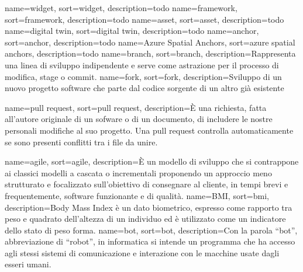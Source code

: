 
\renewcommand{\acronymname}{Acronimi e abbreviazioni}




\renewcommand{\glsnamefont}[1]{\makefirstuc{#1}}

{
    name=widget,
    sort=widget,
    description={todo}
}
{
    name=framework,
    sort=framework,
    description={todo}
}
{
    name=asset,
    sort=asset,
    description={todo}
}
{
    name=digital twin,
    sort=digital twin,
    description={todo}
}
{
    name=anchor,
    sort=anchor,
    description={todo}
}
{
    name=Azure Spatial Anchors,
    sort=azure spatial anchors,
    description={todo}
}
{
    name=branch,
    sort=branch,
    description={Rappresenta una linea di sviluppo indipendente e serve come astrazione per il processo di modifica,
stage o commit.}
}
{
    name=fork,
    sort=fork,
    description={Sviluppo di un nuovo progetto software che parte dal codice sorgente di un altro già esistente}
}

{
    name=pull request,
    sort=pull request,
    description={È una richiesta, fatta all’autore originale di un sofware o di un documento, di includere le nostre personali modifiche al suo progetto. Una pull request controlla automaticamente se sono presenti conflitti tra i file da unire.}
}

{
    name=agile,
    sort=agile,
    description={È un modello di sviluppo che si contrappone ai classici modelli a cascata o incrementali proponendo un approccio meno strutturato e focalizzato sull'obiettivo di consegnare al cliente, in tempi brevi e frequentemente, software funzionante e di qualità. }
}
{
    name=BMI,
    sort=bmi,
    description={Body Mass Index è un dato biometrico, espresso come rapporto tra peso e quadrato dell'altezza di un individuo ed è utilizzato come un indicatore dello stato di peso forma. }
}
{
    name=bot,
    sort=bot,
    description={Con la parola “bot”, abbreviazione di “robot”, in informatica si intende un programma che ha accesso agli stessi sistemi di comunicazione e interazione con le macchine usate dagli esseri umani.}
}

